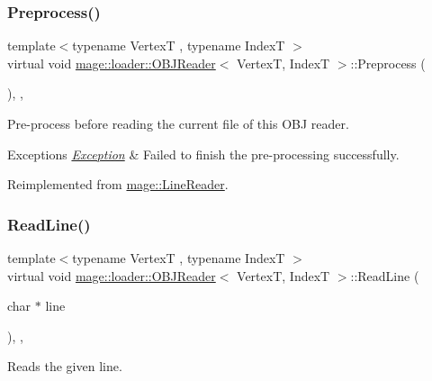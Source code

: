 \subsubsection{\texorpdfstring{Preprocess()}{Preprocess()}}
{\footnotesize\ttfamily template$<$typename VertexT , typename IndexT $>$ \\
virtual void \hyperlink{classmage_1_1loader_1_1_o_b_j_reader}{mage\+::loader\+::\+O\+B\+J\+Reader}$<$ VertexT, IndexT $>$\+::Preprocess (\begin{DoxyParamCaption}{ }\end{DoxyParamCaption})\hspace{0.3cm}{\ttfamily [override]}, {\ttfamily [private]}, {\ttfamily [virtual]}}

Pre-\/process before reading the current file of this O\+BJ reader.


\begin{DoxyExceptions}{Exceptions}
{\em \hyperlink{classmage_1_1_exception}{Exception}} & Failed to finish the pre-\/processing successfully. \\
\hline
\end{DoxyExceptions}


Reimplemented from \hyperlink{classmage_1_1_line_reader_a4de135cfb0434be786cfcfd7959031ef}{mage\+::\+Line\+Reader}.

\hypertarget{classmage_1_1loader_1_1_o_b_j_reader_a9a66ccf1569bdef5194dae20f6282186}{}\label{classmage_1_1loader_1_1_o_b_j_reader_a9a66ccf1569bdef5194dae20f6282186} 
\subsubsection{\texorpdfstring{Read\+Line()}{ReadLine()}}
{\footnotesize\ttfamily template$<$typename VertexT , typename IndexT $>$ \\
virtual void \hyperlink{classmage_1_1loader_1_1_o_b_j_reader}{mage\+::loader\+::\+O\+B\+J\+Reader}$<$ VertexT, IndexT $>$\+::Read\+Line (\begin{DoxyParamCaption}\item[{char $\ast$}]{line }\end{DoxyParamCaption})\hspace{0.3cm}{\ttfamily [override]}, {\ttfamily [private]}, {\ttfamily [virtual]}}

Reads the given line.

